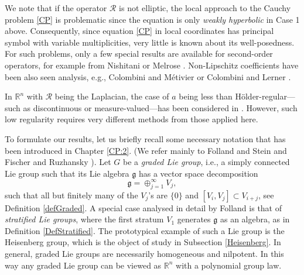 \documentclass[12pt,oneside,a4paper]{book}
\numberwithin{equation}{section}     %
\theoremstyle{plain}
\theoremstyle{definition}
\newcommand{\R}{{\mathbb R}}
\newcommand{\Rn}{{\R}^n}
\begin{document}
We note that if the operator $\mathcal R$ is not elliptic, the local approach to the Cauchy problem \eqref{CP} is problematic since the equation is only {\em weakly hyperbolic} in Case 1 above. Consequently, since equation \eqref{CP} in local coordinates has principal symbol with variable multiplicities, very little is known about its well-posedness. For such problems, only a few special results are available for second-order operators, for example from Nishitani \cite{Nishitani:BSM-1983} or Melrose \cite{Melrose:wave-subelliptic-1986}.
Non-Lipschitz coefficients have been also seen analysis, e.g., Colombini and M\'etivier \cite{CM} or Colombini and Lerner \cite{CL}.

In $\Rn$ with $\mathcal R$ being the Laplacian, the case of $a$ being less than H\"older-regular---such as discontinuous or measure-valued---has been considered in \cite{Garetto-Ruzhansky:ARMA}. However, such low regularity requires very different methods from those applied here.

To formulate our results, let us briefly recall some necessary notation that has been introduced in Chapter \ref{CP:2}. (We refer mainly to Folland and Stein \cite{FS} and Fischer and Ruzhansky \cite{FR2016}).
Let $G$ be a {\em graded Lie group}, i.e., a simply connected Lie group such that its
Lie algebra $\mathfrak g$ has  a vector space decomposition
\begin{equation}\label{EQ:graded}
\mathfrak g = \oplus_{j=1}^\infty V_j,
\end{equation} 
such that all but finitely many of the $V_j$'s are $\{0\}$ and 
$[V_i,V_j]\subset V_{i+j}$, see Definition \ref{defGraded}. A special case analysed in detail by Folland \cite{F75} is that of {\em stratified Lie groups}, where the first stratum $V_1$ generates $\mathfrak g$ as an algebra, as in Definition \ref{DefStratified}. The prototypical example of such a Lie group is the Heisenberg group, which is the object of study in Subsection \ref{Heisenberg}. In general, graded Lie groups are necessarily homogeneous and nilpotent. In this way any graded Lie group can be viewed as $\Rn$ with a polynomial group law. 
\end{document}
